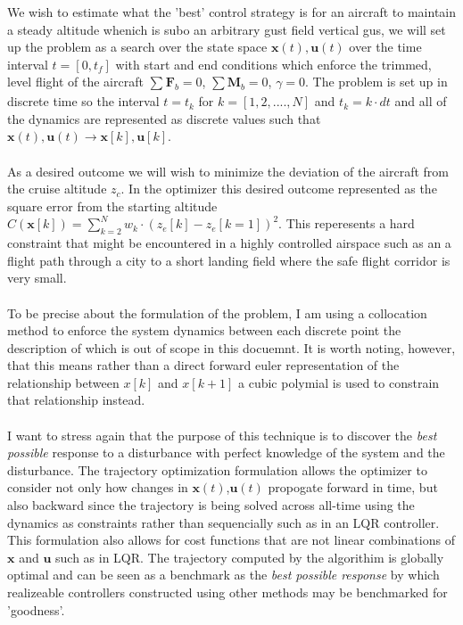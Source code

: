 \documentclass{article}
\begin{document}
We wish to estimate what the 'best' control strategy is for an aircraft to maintain  a steady altitude whenich is subo an arbitrary gust field vertical gus, we will set up the problem as a search over the state space $\mathbf{x}(t), \mathbf{u}(t)$ over the time interval $t = [0, t_f]$ with start and end conditions which enforce the trimmed, level flight of the aircraft $\sum_{}^{}\mathbf{F}_b = 0$, $\sum\mathbf{M}_b = 0$, $\gamma = 0$. 
The problem is set up in discrete time so the interval $t = t_k$ for $ k= [1,2,...., N]$ and $t_k = k \cdot dt$ and all of the dynamics are represented as discrete values such that $\mathbf{x}(t),\mathbf{u}(t) \rightarrow \mathbf{x}[k],\mathbf{u}[k]$. \\
\\
As a desired outcome we will wish to minimize the deviation of the aircraft from the cruise altitude $z_c$. 
In the optimizer this desired outcome represented as the square error from the starting altitude $C(\mathbf{x}[k]) = \sum_{k=2}^{N} w_k \cdot(z_e[k] - z_e[k=1])^2$. 
This reperesents a hard constraint that might be encountered in a highly controlled airspace such as an a flight path through a city to a short landing field where the safe flight corridor is very small. \\
\\
To be precise about the formulation of the problem, I am using a collocation method to enforce the system dynamics between each discrete point the description of which is out of scope in this docuemnt. 
It is worth noting, however, that this means rather than a direct forward euler representation of the relationship between $x[k]$ and $x[k+1]$ a cubic polymial is used to constrain that relationship instead. \\
\\
I want to stress again that the purpose of this technique is to discover the \textit{best possible} response to a disturbance with perfect knowledge of the system and the disturbance. 
The trajectory optimization formulation allows the optimizer to consider not only how changes in $\mathbf{x}(t)$,$\mathbf{u}(t)$ propogate forward in time, but also backward since the trajectory is being solved across all-time using the dynamics as constraints rather than sequencially such as in an LQR controller. 
This formulation also allows for cost functions that are not linear combinations of $\mathbf{x}$ and $\mathbf{u}$ such as in LQR. 
The trajectory computed by the algorithim is globally optimal and can be seen as a benchmark as the \textit{best possible response} by which realizeable controllers constructed using other methods may be benchmarked for 'goodness'.
\end{document}
